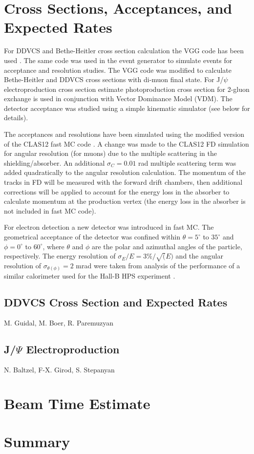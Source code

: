 \documentclass[superscriptaddress,preprintnumbers,amsmath,amssymb,aps,11pt]{revtex4}
\begin{document}
\section{Cross Sections, Acceptances, and Expected Rates}
\indent

For DDVCS and Bethe-Heitler cross section calculation the VGG code has been used \cite{vgg_code}. The same code was used in the event generator to simulate events for acceptance and resolution studies. The VGG code was modified to calculate Bethe-Heitler and DDVCS cross sections with di-muon final state. For J/$\psi$ electroproduction cross section estimate photoproduction cross section for 2-gluon exchange is used in conjunction with Vector Dominance Model (VDM). The detector acceptance was studied using a simple kinematic simulator \cite{fsgen} (see below for details). 

The acceptances and resolutions have been simulated using the modified version of the CLAS12 fast MC code \cite{fastmc}. A change was made to the CLAS12 FD simulation for angular resolution (for muons) due to the multiple scattering in the shielding/absorber. An additional $\sigma_C=0.01$ rad  multiple scattering term was added quadratically to the angular resolution calculation. The momentum of the tracks in FD will be measured with the forward drift chambers, then additional corrections will be applied to account for the energy loss in the absorber to calculate momentum at the production vertex (the energy loss in the absorber is not included in fast MC code).  

For electron detection a new detector was introduced in fast MC. The geometrical acceptance of the detector was confined within $\theta=5^\circ$ to $35^\circ$ and $\phi=0^\circ$ to $60^\circ$, where $\theta$ and $\phi$ are the polar and azimuthal angles of the particle, respectively. The energy resolution of $\sigma_E/E=3\%/\sqrt(E)$ and the angular resolution of $\sigma_{\theta(\phi)}=2$ mrad were taken from analysis of the performance of a similar calorimeter used for the Hall-B HPS experiment \cite{HPS}.


\subsection{DDVCS Cross Section and Expected Rates}
M. Guidal, M. Boer, R. Paremuzyan


\subsection{J/$\Psi$ Electroproduction}
N. Baltzel, F-X. Girod, S. Stepanyan


\section{Beam Time Estimate}

\section{Summary}


\end{document}
